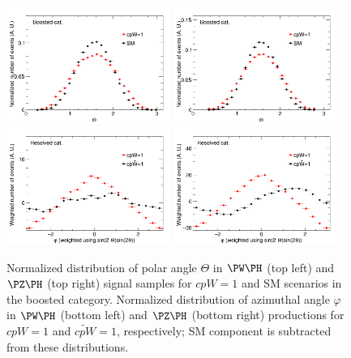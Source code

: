 \documentclass[a4paper,11pt]{article}
\begin{document}
\begin{figure}[hbtp]
\begin{center}
\includegraphics[width=0.475\textwidth]{Figures/New/RECO/Boosted_Plot_Theta_WH.png}
\includegraphics[width=0.475\textwidth]{Figures/New/RECO/Boosted_Plot_Theta_ZH.png}
\includegraphics[width=0.475\textwidth]{Figures/New/RECO/Resolved_Plot_phi_WH_CP.png}
\includegraphics[width=0.475\textwidth]{Figures/New/RECO/Resolved_Plot_phi_ZH_CP.png}
\end{center}
\caption{
Normalized distribution of polar angle $\Theta$ in $\PW\PH$ (top left) and $\PZ\PH$ (top right) signal samples for $cpW=1$ and SM scenarios in the boosted category. 
Normalized distribution of azimuthal angle $\varphi$ in  $\PW\PH$ (bottom left) and $\PZ\PH$ (bottom right) productions for $cpW=1$ and $\tilde{cpW}=1$, respectively; SM component is subtracted from these distributions.
}
\label{fig:angles}
\end{figure}
\end{document}
